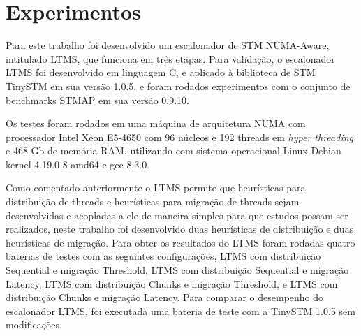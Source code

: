 \documentclass[diss,capa]{texufpel}
\begin{document}







\chapter{Experimentos}
\label{chapter::experimentos}

Para este trabalho foi desenvolvido um escalonador de STM NUMA-Aware, intitulado LTMS, que funciona em três etapas. Para validação, o escalonador LTMS foi desenvolvido em linguagem C, e aplicado à biblioteca de STM TinySTM em sua versão 1.0.5, e foram rodados experimentos com o conjunto de benchmarks STMAP em sua versão 0.9.10.

Os testes foram rodados em uma máquina de arquitetura NUMA com processador Intel Xeon E5-4650 com 96 núcleos e 192 threads em \emph{hyper threading} e 468 Gb de memória RAM, utilizando com sistema operacional Linux Debian kernel 4.19.0-8-amd64  e gcc 8.3.0.

Como comentado anteriormente o LTMS permite que heurísticas para distribuição de threads e heurísticas para migração de threads sejam desenvolvidas e acopladas a ele de maneira simples para que estudos possam ser realizados, neste trabalho foi desenvolvido duas heurísticas de distribuição e duas heurísticas de migração. Para obter os resultados do LTMS foram rodadas quatro baterias de testes com as seguintes configurações, LTMS com distribuição Sequential e migração Threshold, LTMS com distribuição Sequential e migração Latency, LTMS com distribuição Chunks e migração Threshold, e LTMS com distribuição Chunks e migração Latency. Para comparar o desempenho do escalonador LTMS, foi executada uma bateria de teste com a TinySTM 1.0.5 sem modificações.
\end{document}
